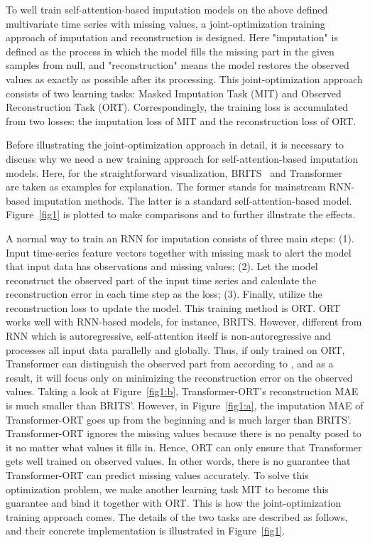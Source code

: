 \documentclass{article}
\begin{document}
To well train self-attention-based imputation models on the above defined multivariate time series with missing values, a joint-optimization training approach of imputation and reconstruction is designed. Here "imputation" is defined as the process in which the model fills the missing part in the given samples from null, and "reconstruction" means the model restores the observed values as exactly as possible after its processing. This joint-optimization approach consists of two learning tasks: Masked Imputation Task (MIT) and Observed Reconstruction Task (ORT). Correspondingly, the training loss is accumulated from two losses: the imputation loss of MIT and the reconstruction loss of ORT.

Before illustrating the joint-optimization approach in detail, it is necessary to discuss why we need a new training approach for self-attention-based imputation models. Here, for the straightforward visualization, BRITS~\cite{Cao2018BRITS} and Transformer~\cite{Vaswani2017SelfAttention} are taken as examples for explanation. The former stands for mainstream RNN-based imputation methods. The latter is a standard self-attention-based model. Figure~\ref{fig1} is plotted to make comparisons and to further illustrate the effects. 

A normal way to train an RNN for imputation consists of three main steps: (1). Input time-series feature vectors  together with missing mask  to alert the model that input data has observations and missing values; (2). Let the model reconstruct the observed part of the input time series and calculate the reconstruction error in each time step as the loss; (3). Finally, utilize the reconstruction loss to update the model. This training method is ORT. ORT works well with RNN-based models, for instance, BRITS. However, different from RNN which is autoregressive, self-attention itself is non-autoregressive and processes all input data parallelly and globally. Thus, if only trained on ORT, Transformer can distinguish the observed part from  according to , and as a result, it will focus only on minimizing the reconstruction error on the observed values. Taking a look at Figure~\ref{fig1:b}, Transformer-ORT's reconstruction MAE is much smaller than BRITS'. However, in Figure~\ref{fig1:a}, the imputation MAE of Transformer-ORT goes up from the beginning and is much larger than BRITS'. Transformer-ORT ignores the missing values because there is no penalty posed to it no matter what values it fills in. Hence, ORT can only ensure that Transformer gets well trained on observed values. In other words, there is no guarantee that Transformer-ORT can predict missing values accurately. To solve this optimization problem, we make another learning task MIT to become this guarantee and bind it together with ORT. This is how the joint-optimization training approach comes. The details of the two tasks are described as follows, and their concrete implementation is illustrated in Figure~\ref{fig1}.
\end{document}
